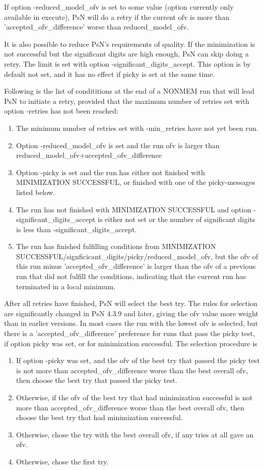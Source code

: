 If option -reduced\_model\_ofv is set to some value (option currently only available in execute), PsN will do a retry if the current ofv is more than 'accepted\_ofv\_difference' worse than reduced\_model\_ofv.

It is also possible to reduce PsN's requirements of quality. If the minimization is not successful but the significant digits are high enough, PsN can skip doing a retry. The limit is set with option -significant\_digits\_accept. This option is by default not set, and it has no effect if picky is set at the same time.

Following is the list of condititions at the end of a NONMEM run that will lead PsN to initiate a retry, provided that the maximum number of retries set with option -retries has not been reached:

\begin{enumerate}
\item The minimum number of retries set with -min\_retries have not yet been run.
\item Option -reduced\_model\_ofv is set and the run ofv is larger than reduced\_model\_ofv+accepted\_ofv\_difference
\item Option -picky is set and the run has either not finished with MINIMIZATION SUCCESSFUL, or finished with one of the picky-messages listed below.
\item The run has not finished with MINIMIZATION SUCCESSFUL and option -significant\_digits\_accept is 
either not set or the number of significant digits is less than -significant\_digits\_accept.
\item The run has finished fulfilling conditions from MINIMIZATION SUCCESSFUL/signficicant\_digits/picky/reduced\_model\_ofv, 
but the ofv of this run minus 'accepted\_ofv\_difference' is larger than the ofv of a previous run 
that did not fulfill the conditions, indicating that the current run has terminated in a local minimum.
\end{enumerate}

After all retries have finished, PsN will select the best try. The rules for selection are significantly changed in PsN 4.3.9 and later, giving the ofv value more weight than in earlier versions. In most cases the run with the lowest ofv is selected, but there is a 'accepted\_ofv\_difference' preference for runs that pass the picky test, if option picky was set, or for minimization successful.
The selection procedure is 
\begin{enumerate}
\item If option -picky was set, and the ofv of the best try that passed the picky test is not more than accepted\_ofv\_difference
worse than the best overall ofv, then choose the best try that passed the picky test. 
\item Otherwise, if the ofv of the best try that had minimization successful is not more than accepted\_ofv\_difference
worse than the best overall ofv, then choose the best try that had minimization successful.
\item Otherwise, chose the try with the best overall ofv, if any tries at all gave an ofv.
\item Otherwise, chose the first try.
\end{enumerate}

